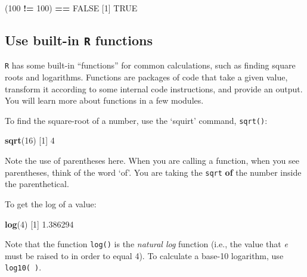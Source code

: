 \documentclass[
]{book}
\newenvironment{Shaded}{\begin{snugshade}}{\end{snugshade}}
\newcommand{\DecValTok}[1]{\textcolor[rgb]{0.00,0.00,0.81}{#1}}
\newcommand{\FloatTok}[1]{\textcolor[rgb]{0.00,0.00,0.81}{#1}}
\newcommand{\KeywordTok}[1]{\textcolor[rgb]{0.13,0.29,0.53}{\textbf{#1}}}
\newcommand{\NormalTok}[1]{#1}
\newcommand{\OperatorTok}[1]{\textcolor[rgb]{0.81,0.36,0.00}{\textbf{#1}}}
\newcommand{\OtherTok}[1]{\textcolor[rgb]{0.56,0.35,0.01}{#1}}
\newcommand{\StringTok}[1]{\textcolor[rgb]{0.31,0.60,0.02}{#1}}
\begin{document}
\begin{Shaded}
\begin{Highlighting}[]
\NormalTok{(}\DecValTok{100} \OperatorTok{!=}\StringTok{ }\DecValTok{100}\NormalTok{) }\OperatorTok{==}\StringTok{ }\OtherTok{FALSE}
\NormalTok{[}\DecValTok{1}\NormalTok{] }\OtherTok{TRUE}
\end{Highlighting}
\end{Shaded}

\hypertarget{use-built-in-r-functions}{%
\subsection*{\texorpdfstring{Use built-in \texttt{R} functions}{Use built-in R functions}}\label{use-built-in-r-functions}}

\texttt{R} has some built-in ``functions'' for common calculations, such as finding square roots and logarithms. Functions are packages of code that take a given value, transform it according to some internal code instructions, and provide an output. You will learn more about functions in a few modules.

To find the square-root of a number, use the `squirt' command, \texttt{sqrt()}:

\begin{Shaded}
\begin{Highlighting}[]
\KeywordTok{sqrt}\NormalTok{(}\DecValTok{16}\NormalTok{)}
\NormalTok{[}\DecValTok{1}\NormalTok{] }\DecValTok{4}
\end{Highlighting}
\end{Shaded}

Note the use of parentheses here. When you are calling a function, when you see parentheses, think of the word `of'. You are taking the \texttt{sqrt} \textbf{of} the number inside the parenthetical.

To get the log of a value:

\begin{Shaded}
\begin{Highlighting}[]
\KeywordTok{log}\NormalTok{(}\DecValTok{4}\NormalTok{)}
\NormalTok{[}\DecValTok{1}\NormalTok{] }\FloatTok{1.386294}
\end{Highlighting}
\end{Shaded}

Note that the function \texttt{log()} is the \emph{natural log} function (i.e., the value that \emph{e} must be raised to in order to equal 4). To calculate a base-10 logarithm, use \texttt{log10(\ )}.
\end{document}
